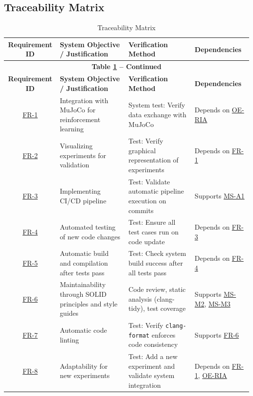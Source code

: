 \documentclass[12pt]{article}
\begin{document}
\begin{landscape}
\section{Traceability Matrix}
  \begin{longtable}{|c|p{6cm}|p{5cm}|p{4cm}|}
    \caption{Traceability Matrix} \label{tab:traceability_matrix} \\
    \hline
    \textbf{Requirement ID} & \textbf{System Objective / Justification} & \textbf{Verification Method} & \textbf{Dependencies} \\
    \hline
    \endfirsthead
    \multicolumn{4}{c}{\textbf{Table \ref{tab:traceability_matrix} -- Continued}}\\[0.5ex]
    \hline
    \textbf{Requirement ID} & \textbf{System Objective / Justification} & \textbf{Verification Method} & \textbf{Dependencies} \\
    \hline
    \endhead
    \hyperref[FR-1]{FR-1} & Integration with MuJoCo for reinforcement learning & System test: Verify data exchange with MuJoCo & Depends on \hyperref[OE-RIA]{OE-RIA} \\
    \hline
    \hyperref[FR-2]{FR-2} & Visualizing experiments for validation & Test: Verify graphical representation of experiments & Depends on \hyperref[FR-1]{FR-1} \\
    \hline
    \hyperref[FR-3]{FR-3} & Implementing CI/CD pipeline & Test: Validate automatic pipeline execution on commits & Supports \hyperref[MS-A1]{MS-A1} \\
    \hline
    \hyperref[FR-4]{FR-4} & Automated testing of new code changes & Test: Ensure all test cases run on code update & Depends on \hyperref[FR-3]{FR-3} \\
    \hline
    \hyperref[FR-5]{FR-5} & Automatic build and compilation after tests pass & Test: Check system build success after all tests pass & Depends on \hyperref[FR-4]{FR-4} \\
    \hline
    \hyperref[FR-6]{FR-6} & Maintainability through SOLID principles and style guides & Code review, static analysis (clang-tidy), test coverage & Supports \hyperref[MS-M2]{MS-M2}, \hyperref[MS-M3]{MS-M3} \\
    \hline
    \hyperref[FR-7]{FR-7} & Automatic code linting & Test: Verify \texttt{clang-format} enforces code consistency & Supports \hyperref[FR-6]{FR-6} \\
    \hline
    \hyperref[FR-8]{FR-8} & Adaptability for new experiments & Test: Add a new experiment and validate system integration & Depends on \hyperref[FR-1]{FR-1}, \hyperref[OE-RIA]{OE-RIA} \\

\end{longtable}
\end{landscape}
\end{document}
